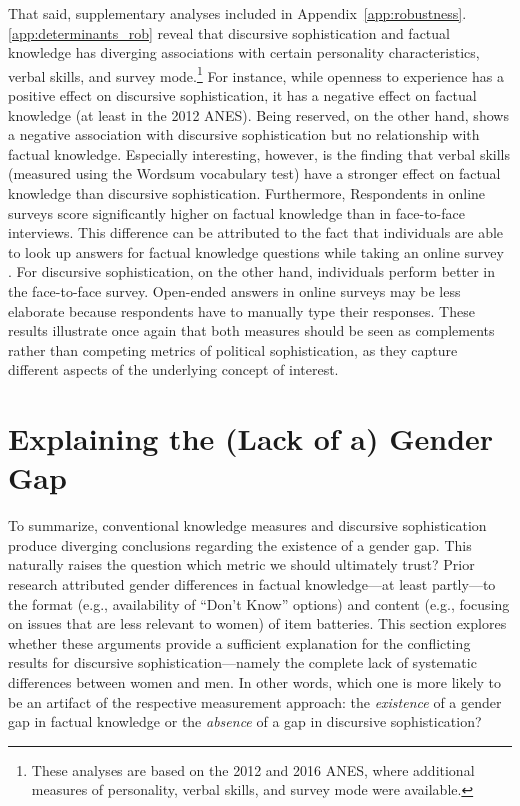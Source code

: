 That said, supplementary analyses included in Appendix~\ref{app:robustness}.\ref{app:determinants_rob} reveal that discursive sophistication and factual knowledge has diverging associations with certain personality characteristics, verbal skills, and survey mode.\footnote{These analyses are based on the 2012 and 2016 ANES, where additional measures of personality, verbal skills, and survey mode were available.} For instance, while openness to experience has a positive effect on discursive sophistication, it has a negative effect on factual knowledge (at least in the 2012 ANES). Being reserved, on the other hand, shows a negative association with discursive sophistication but no relationship with factual knowledge. Especially interesting, however, is the finding that verbal skills (measured using the Wordsum vocabulary test) have a stronger effect on factual knowledge than discursive sophistication. Furthermore, Respondents in online surveys score significantly higher on factual knowledge than in face-to-face interviews. This difference can be attributed to the fact that individuals are able to look up answers for factual knowledge questions while taking an online survey \citep[cf.][]{clifford2016cheating}. For discursive sophistication, on the other hand, individuals perform better in the face-to-face survey. Open-ended answers in online surveys may be less elaborate because respondents have to manually type their responses. These results illustrate once again that both measures should be seen as complements rather than competing metrics of political sophistication, as they capture different aspects of the underlying concept of interest. 


\section*{Explaining the (Lack of a) Gender Gap}

To summarize, conventional knowledge measures and discursive sophistication produce diverging conclusions regarding the existence of a gender gap. This naturally raises the question which metric we should ultimately trust? Prior research attributed gender differences in factual knowledge---at least partly---to the format (e.g., availability of ``Don't Know'' options) and content (e.g., focusing on issues that are less relevant to women) of item batteries. This section explores whether these arguments provide a sufficient explanation for the conflicting results for discursive sophistication---namely the complete lack of systematic differences between women and men. In other words, which one is more likely to be an artifact of the respective measurement approach: the \textit{existence} of a gender gap in factual knowledge or the \textit{absence} of a gap in discursive sophistication?

